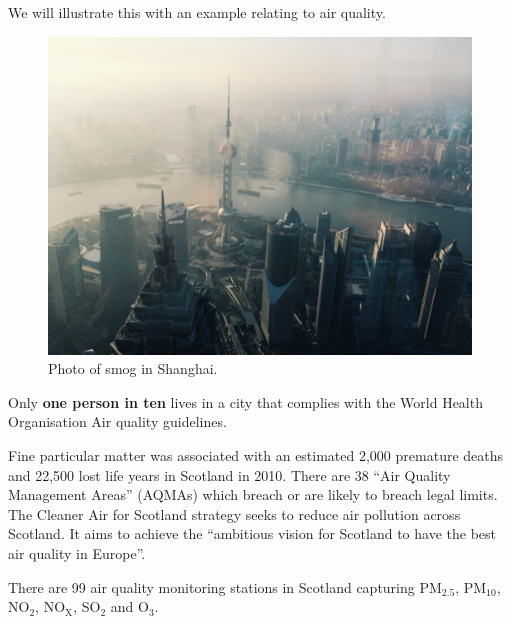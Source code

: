 \documentclass[
  letterpaper,
  DIV=11,
  numbers=noendperiod]{scrartcl}
\begin{document}
\begin{tcolorbox}[enhanced jigsaw, opacityback=0, coltitle=black, opacitybacktitle=0.6, breakable, toprule=.15mm, bottomtitle=1mm, title={Example: Air quality}, colback=white, leftrule=.75mm, titlerule=0mm, toptitle=1mm, arc=.35mm, bottomrule=.15mm, rightrule=.15mm, colframe=quarto-callout-important-color-frame, colbacktitle=quarto-callout-important-color!10!white, left=2mm]

We will illustrate this with an example relating to air quality.

\begin{figure}[H]

{\centering \includegraphics[width=5.20833in,height=\textheight]{images/Shanghai.jpg}

}

\caption{Photo of smog in Shanghai.}

\end{figure}%

Only \textbf{one person in ten} lives in a city that complies with the
World Health Organisation Air quality guidelines.

Fine particular matter was associated with an estimated 2,000 premature
deaths and 22,500 lost life years in Scotland in 2010. There are 38
``Air Quality Management Areas'' (AQMAs) which breach or are likely to
breach legal limits. The Cleaner Air for Scotland strategy seeks to
reduce air pollution across Scotland. It aims to achieve the ``ambitious
vision for Scotland to have the best air quality in Europe''.

There are 99 air quality monitoring stations in Scotland capturing
PM\(_{2.5}\), PM\(_{10}\), NO\(_2\), NO\(_\text{X}\), SO\(_2\) and
O\(_3\).


\end{tcolorbox}
\end{document}
